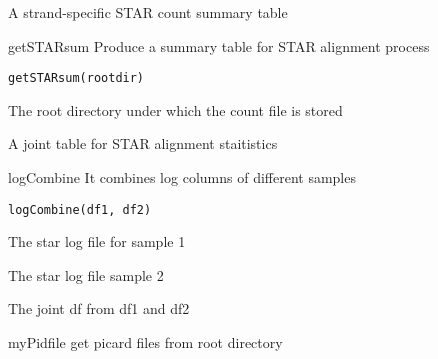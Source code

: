 \documentclass[letterpaper]{book}
\begin{document}
%
\begin{Value}
A strand-specific STAR count summary table
\end{Value}
%
\begin{Description}\relax
getSTARsum
Produce a summary table for STAR alignment process
\end{Description}
%
\begin{Usage}
\begin{verbatim}
getSTARsum(rootdir)
\end{verbatim}
\end{Usage}
%
\begin{Arguments}
\begin{ldescription}
\item[\code{rootdir}] The root directory under which the count file is stored
\end{ldescription}
\end{Arguments}
%
\begin{Value}
A joint table for STAR alignment staitistics
\end{Value}
%
\begin{Description}\relax
logCombine
It combines log columns of different samples
\end{Description}
%
\begin{Usage}
\begin{verbatim}
logCombine(df1, df2)
\end{verbatim}
\end{Usage}
%
\begin{Arguments}
\begin{ldescription}
\item[\code{df1}] The star log file for sample 1

\item[\code{df2}] The star log file sample 2
\end{ldescription}
\end{Arguments}
%
\begin{Value}
The joint df from df1 and df2
\end{Value}
%
\begin{Description}\relax
myPidfile
get picard  files from root directory
\end{Description}
\end{document}
